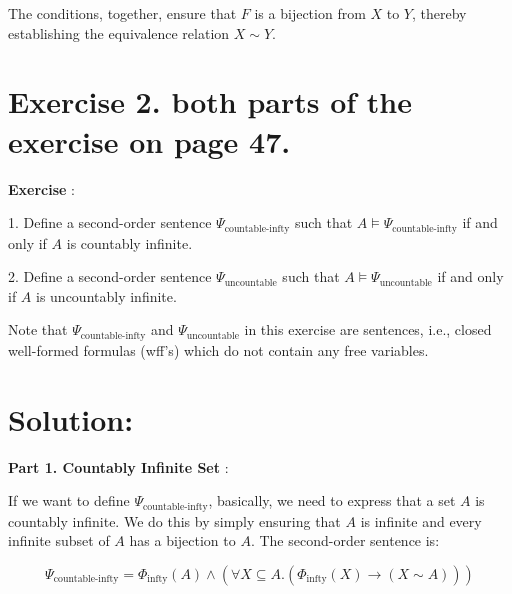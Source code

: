 \documentclass{article}
\begin{document}
\vspace{1em}
The conditions, together, ensure that $F$ is a bijection from $X$ to $Y$, thereby establishing the equivalence relation $X \sim Y$.

\newpage


\section*{Exercise 2. both parts of the exercise on page 47.}

\begin{mdframed}
    \vspace{1em}
        \textbf{Exercise }: 
        
\vspace{1em}
        1. Define a second-order sentence \( \Psi_{\text{countable-infty}} \) such that \( A \models \Psi_{\text{countable-infty}} \) if and only if \( A \) is countably infinite.

\vspace{1em}
        2. Define a second-order sentence \( \Psi_{\text{uncountable}} \) such that \( A \models \Psi_{\text{uncountable}} \) if and only if \( A \) is uncountably infinite.

\vspace{1em}
        Note that \( \Psi_{\text{countable-infty}} \) and \( \Psi_{\text{uncountable}} \) in this exercise are sentences, i.e., closed well-formed formulas (wff's) which do not contain any free variables.

    \vspace{1em}
\end{mdframed}
    


\section*{Solution:}

\textbf{Part 1. Countably Infinite Set }:

\vspace{1em}
If we want to define \( \Psi_{\text{countable-infty}} \), basically, we need to express that a set \( A \) is countably infinite. 
We do this by simply ensuring that \( A \) is infinite and every infinite subset of \( A \) has a bijection to \( A \). The second-order sentence is:

\vspace{1em}
\[
\Psi_{\text{countable-infty}} = \Phi_{\text{infty}}(A) \land (\forall X \subseteq A. (\Phi_{\text{infty}}(X) \rightarrow (X \sim A)))
\]
\end{document}
